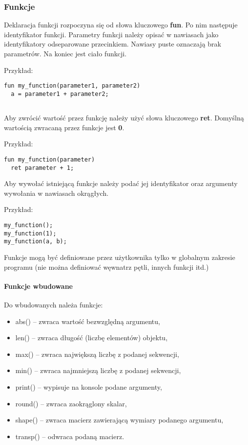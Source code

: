 \documentclass[12pt,a4paper]{article}
\begin{document}
\subsubsection{Funkcje}

Deklaracja funkcji rozpoczyna się od słowa kluczowego \textbf{fun}.
Po nim następuje identyfikator funkcji. Parametry funkcji należy opisać w nawiasach jako identyfikatory odseparowane przecinkiem. Nawiasy puste oznaczają brak parametrów. Na koniec jest ciało funkcji.

\medskip

Przykład:

\begin{lstlisting}
fun my_function(parameter1, parameter2)
  a = parameter1 + parameter2;
  
\end{lstlisting}

Aby zwrócić wartość przez funkcję należy użyć słowa kluczowego \textbf{ret}. Domyślną wartością zwracaną przez funkcje jest \textbf{0}.

\medskip
Przykład:

\begin{lstlisting}
fun my_function(parameter)
  ret parameter + 1;

\end{lstlisting}

Aby wywołać istniejącą funkcje należy podać jej identyfikator oraz argumenty wywołania w nawiasach okrągłych.

\medskip
Przykład:

\begin{lstlisting}
my_function();
my_function(1);
my_function(a, b);
\end{lstlisting}

Funkcje mogą być definiowane przez użytkownika tylko w globalnym zakresie programu (nie można definiować węwnatrz pętli, innych funkcji itd.)

\paragraph{Funkcje wbudowane}

\medskip
Do wbudowanych należa funkcje:

\begin{itemize}

  \item abs() -- zwraca wartość bezwzględną argumentu,
  \item len() -- zwraca długość (liczbę elementów) objektu,
  \item max() -- zwraca największą liczbę z podanej sekwencji,
  \item min() -- zwraca najmniejszą liczbę z podanej sekwencji,
  \item print() -- wypisuje na konsole podane argumenty,
  \item round() -- zwraca zaokrąglony skalar,
  \item shape() -- zwraca macierz zawierającą wymiary podanego argumentu,
  \item transp() -- odwraca podaną macierz.
  
\end{itemize}
\end{document}
